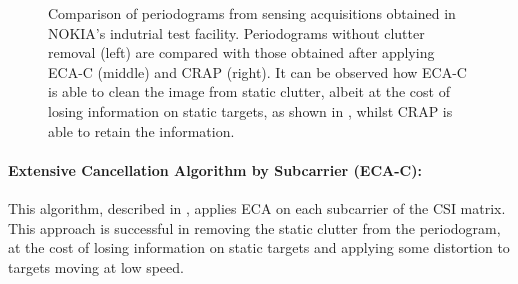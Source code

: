 \begin{figure}[!t]
{		}\hfill
		\caption[]{\small Comparison of periodograms from sensing acquisitions obtained in NOKIA's indutrial test facility.
			Periodograms without clutter removal (left) are compared with those obtained after applying ECA-C (middle) and CRAP (right). It can be observed how ECA-C is able to clean the image from static clutter, albeit at the cost of losing information on static targets, as shown in , whilst CRAP is able to retain the information.  }
		\label{fig:Rad_clutter_crap-ecac}
	\end{figure}	
	\paragraph{Extensive Cancellation Algorithm by Subcarrier (ECA-C):}
	This algorithm, described in \cite{Wan_Cheng_Gong_Zhao_Shao_2012}, applies ECA \cite{Colone_ECA_2009} on each subcarrier of the CSI matrix.
	This approach is successful in removing the static clutter from the periodogram, at the cost of losing information on static targets and applying some distortion to targets moving at low speed.
